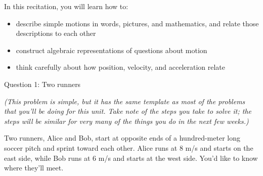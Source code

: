 \documentclass[12pt]{article}
\newcommand{\BI}{\begin{itemize}}
\newcommand{\EI}{\end{itemize}}
\def\BS{\bigskip}
\begin{document}
\Large
\centerline{}
\normalsize
\centerline{}
\normalsize
\medskip

\BS\BS\BS


In this recitation, you will learn how to:

\BI
\item describe simple motions in words, pictures, and mathematics, and relate those descriptions to each other
\item construct algebraic representations of questions about motion
\item think carefully about how position, velocity, and acceleration relate
\EI



\centerline{\Large Question 1: Two runners}

\begin{center}
\it (This problem is simple, but it has the same template as most of the problems that you'll be doing for this unit. Take note of the steps you take to solve it; the steps will be similar for very many of the things you do in the next few weeks.)

\end{center}
\rm
Two runners, Alice and Bob, start at opposite ends of a hundred-meter long soccer pitch and sprint toward each other. Alice runs at 8 m/s and starts on the east side, while Bob runs at 6 m/s and starts at the west side. You'd like to know where they'll meet.
\end{document}

